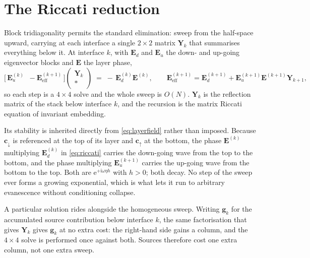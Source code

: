 \documentclass[11pt,a4paper]{article}
\newcommand{\ii}{\mathrm{i}}
\newcommand{\bE}{\mathbf{E}}
\newcommand{\bY}{\mathbf{Y}}
\begin{document}
\section{The Riccati reduction}
\label{sec:riccati}

Block tridiagonality permits the standard elimination: sweep from the
half-space upward, carrying at each interface a single $2\times2$ matrix
$\bY_k$ that summarises everything below it. At interface $k$, with $\bE_d$ and
$\bE_u$ the down- and up-going eigenvector blocks and $\bE$ the layer phase,
\begin{equation}\label{eq:riccati}
  \bigl[\,\bE_u^{(k)} \;\; -\bE_{\text{eff}}^{(k+1)}\,\bigr]
  \begin{pmatrix}\bY_k\\ \ast\end{pmatrix}
  \;=\;-\,\bE_d^{(k)}\bE^{(k)},
  \qquad
  \bE_{\text{eff}}^{(k+1)} = \bE_d^{(k+1)} + \bE_u^{(k+1)}\bE^{(k+1)}\bY_{k+1},
\end{equation}
so each step is a $4\times4$ solve and the whole sweep is $O(N)$. $\bY_k$ is the
reflection matrix of the stack below interface $k$, and the recursion is the
matrix Riccati equation of invariant embedding.

Its stability is inherited directly from \eqref{eq:layerfield} rather than
imposed. Because $\mathbf{c}_{\downarrow}$ is referenced at the top of its layer
and $\mathbf{c}_{\uparrow}$ at the bottom, the phase $\bE^{(k)}$ multiplying
$\bE_d^{(k)}$ in \eqref{eq:riccati} carries the down-going wave from the top to
the bottom, and the phase multiplying $\bE_u^{(k+1)}$ carries the up-going wave
from the bottom to the top. Both are $\mathrm{e}^{+\ii\omega\eta h}$ with
$h>0$; both decay. No step of the sweep ever forms a growing exponential, which
is what lets it run to arbitrary evanescence without conditioning collapse.

A particular solution rides alongside the homogeneous sweep. Writing
$\mathbf{g}_k$ for the accumulated source contribution below interface $k$, the
same factorisation that gives $\bY_k$ gives $\mathbf{g}_k$ at no extra cost:
the right-hand side gains a column, and the $4\times4$ solve is performed once
against both. Sources therefore cost one extra column, not one extra sweep.

\end{document}
